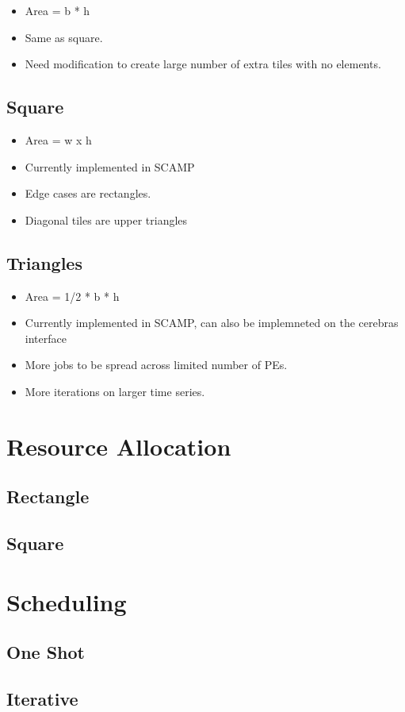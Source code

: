 \begin{itemize}
    \item Area = b * h
    \item Same as square.
    \item Need modification to create large number of extra tiles with no elements.
\end{itemize}

\subsection{Square}

\begin{itemize}
    \item Area = w x h
    \item Currently implemented in SCAMP
    \item Edge cases are rectangles.
    \item Diagonal tiles are upper triangles
\end{itemize}

\subsection{Triangles}

\begin{itemize}
    \item Area = 1/2 * b * h
    \item Currently implemented in SCAMP, can also be implemneted on the cerebras interface
    \item More jobs to be spread across limited number of PEs.
    \item More iterations on larger time series.
\end{itemize}


\section{Resource Allocation}
\subsection{Rectangle}


\subsection{Square}

\section{Scheduling}
\subsection{One Shot}
\subsection{Iterative}


